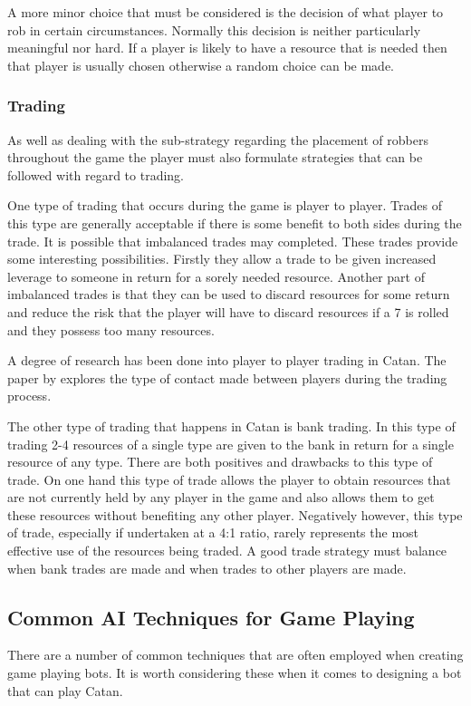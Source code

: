 \documentclass[]{article}
\begin{document}
\par A more minor choice that must be considered is the decision of what player to rob in certain circumstances. Normally this decision is neither particularly meaningful nor hard. If a player is likely to have a resource that is needed then that player is usually chosen otherwise a random choice can be made.

\subsubsection{Trading}
As well as dealing with the sub-strategy regarding the placement of robbers throughout the game the player must also formulate strategies that can be followed with regard to trading.

\par One type of trading that occurs during the game is player to player. Trades of this type are generally acceptable if there is some benefit to both sides during the trade. It is possible that imbalanced trades may completed. These trades provide some interesting possibilities. Firstly they allow a trade to be given increased leverage to someone in return for a sorely needed resource. Another part of imbalanced trades is that they can be used to discard resources for some return and reduce the risk that the player will have to discard resources if a 7 is rolled and they possess too many resources.

\par A degree of research has been done into player to player trading in Catan. The paper by \textcite{afantenos2012developing} explores the type of contact made between players during the trading process.

\par The other type of trading that happens in Catan is bank trading. In this type of trading 2-4 resources of a single type are given to the bank in return for a single resource of any type. There are both positives and drawbacks to this type of trade. On one hand this type of trade allows the player to obtain resources that are not currently held by any player in the game and also allows them to get these resources without benefiting any other player. Negatively however, this type of trade, especially if undertaken at a 4:1 ratio, rarely represents the most effective use of the resources being traded. A good trade strategy must balance when bank trades are made and when trades to other players are made.

\subsection{Common AI Techniques for Game Playing}
There are a number of common techniques that are often employed when creating game playing bots. It is worth considering these when it comes to designing a bot that can play Catan.
\end{document}

